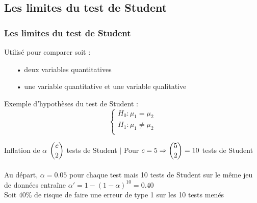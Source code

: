 \documentclass{beamer}
\begin{document}
\subsection{Les limites du test de Student}
\begin{frame}
\frametitle{Les limites du test de Student}
Utilisé pour comparer soit :
\begin{itemize}
\item[•] deux variables quantitatives
\item[•] une variable quantitative et une variable qualitative \\
\end{itemize}

\begin{exampleblock}{Exemple d'hypothèses du test de Student :}
\[\left\{\begin{array}{ll}
H_0 : \mu_1 = \mu_2 \\
H_1 : \mu_1 \neq \mu_2 \\
\end{array}\right. \]
\end{exampleblock}

\begin{alertblock}{Inflation de $\alpha$}
$\dbinom{c}{2}$ tests de Student  $\rvert$
Pour $c=5 \Rightarrow \dbinom{5}{2}=10$ tests de Student \\~\\
Au départ, $\alpha=0.05$ pour chaque test mais 10 tests de Student sur le même jeu de données entraîne $ \alpha'= 1 - (1 - \alpha)^{10} = 0.40$ \\
Soit 40\% de risque de faire une erreur de type 1 sur les 10 tests menés 
\end{alertblock}
\end{frame}
\end{document}
